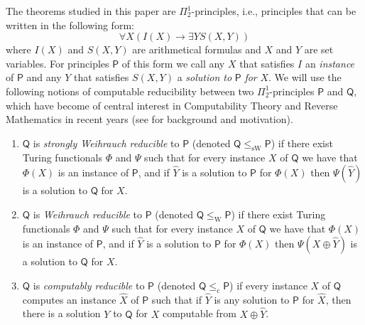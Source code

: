 \documentclass[a4paper,11pt]{article}
\newcommand\compred{\mathrm{c}}
\newcommand\scompred{\mathrm{sc}}
\newcommand\W{\mathrm{W}}
\newcommand\sW{\mathrm{sW}}
\newcommand\Q{\mathsf{Q}}
\newcommand\PP{\mathsf{P}}
\begin{document}
The theorems studied in this paper are $\Pi^1_2$-principles, i.e., principles that can be written in the following form: 
$$ \forall X (I(X) \to \exists Y S(X,Y))$$
where $I(X)$ and $S(X,Y)$ are arithmetical formulas and $X$ and $Y$ are set variables. For principles $\PP$ of this form we call any $X$ that satisfies
$I$ an {\em instance} of $\PP$ and any $Y$ that satisfies $S(X,Y)$ a {\em solution to} $\PP$ {\em for} $X$.
We will use the following notions of computable reducibility between two $\Pi^1_2$-principles $\PP$ and $\Q$, 
which have become of central interest in Computability Theory and Reverse Mathematics in recent years
(see \cite{Dza-Mum:22} for background and motivation).

\begin{enumerate}
\item $\Q$ is {\em strongly Weihrauch reducible} to $\PP$ (denoted $\Q \leq_{\sW} \PP$) if there exist Turing functionals $\Phi$ and $\Psi$ such 
that for every instance $X$ of $\Q$ we have that $\Phi(X)$ is an instance of $\PP$, and if $\hat{Y}$ is a solution to $\PP$ for $\Phi(X)$
then $\Psi(\hat{Y})$ is a solution to $\Q$ for $X$.
\item $\Q$ is {\em Weihrauch reducible} to $\PP$ (denoted $\Q \leq_\W \PP$) if there exist Turing functionals $\Phi$ and $\Psi$ such 
that for every instance $X$ of $\Q$ we have that $\Phi(X)$ is an instance of $\PP$, and if $\hat{Y}$ is a solution to $\PP$ for $\Phi(X)$
then $\Psi(X\oplus \hat{Y})$ is a solution to $\Q$ for $X$.
\item $\Q$ is {\em computably reducible} to $\PP$ (denoted $\Q \leq_{\mathrm{c}} \PP$) if every instance $X$ of $\Q$ computes an instance $\hat{X}$ of $\PP$ such that
if $\hat{Y}$ is any solution to $\PP$ for $\hat{X}$, then there is a solution $Y$ to $\Q$ for $X$ computable from $X \oplus \hat{Y}$. 
\end{enumerate}
\end{document}
